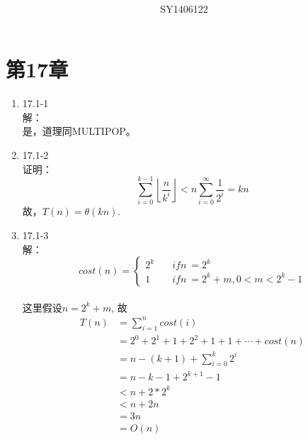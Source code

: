 \documentclass[UTF8]{ctexart}
\begin{document}
\title{\\}
\vspace{2cm}
\author{\\SY1406122}
\date{}
\maketitle

\section*{第17章}
\begin{enumerate}
    \item 17.1-1 \\
    解：\\
    是，道理同MULTIPOP。
	
	\item 17.1-2 \\
	证明：\\
	\[
		\sum_{i=0}^{k-1}\left \lfloor \frac{n}{k^i} \right \rfloor <
		n\sum_{i=0}^{\infty} \frac{1}{2^i} = kn
	\]
	故，$T(n) = \theta{(kn)}$.
	
	\item 17.1-3 \\
	解：
	\[
		cost(n) = \left\{
		\begin{aligned}
		2^k	&\quad if n\ = 2^k \\
		1	&\quad if n\ = 2^k+m, 0<m<2^k-1
		\end{aligned}
        \right.
	\]	\\
	这里假设$n = 2^k + m$, 故
	\begin{align*}
		T(n)&= \sum_{i=1}^{n} cost(i)	\\
			&= 2^0 + 2^1 + 1 + 2^2 + 1 + 1 + \cdots + cost(n)	\\
			&= n - (k+1) + \sum_{i=0}^{k} 2^i	\\
			&= n - k - 1 + 2^{k+1} -1	\\
			&< n + 2*2^k	\\
			&< n + 2n	\\
			&= 3n	\\
			&= O(n)
	\end{align*}
	

\end{enumerate}
\end{document}
